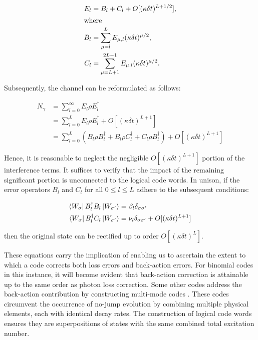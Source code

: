 \documentclass[11pt]{article}
\newcommand\0{\mathbf{0}}
\newcommand\<{\langle}
\renewcommand\>{\rangle}
\begin{document}
\begin{align*}
E_l &= B_l + C_l + O[(\kappa \delta t)^{L + 1/2}],	\\
\intertext{where}
B_l &= \sum_{\mu = l }^L E_{\mu, l}(\kappa \delta t)^{\mu / 2}, \\
C_l &= \sum_{\mu = L+1 }^{2L - 1} E_{\mu, l}(\kappa \delta t)^{\mu / 2}.
\end{align*}

Subsequently, the channel can be reformulated as follows:

\begin{align*}
N_\gamma &= \sum_{l=0}^\infty E_l \rho E_l^\dag\\
&= \sum_{l=0}^L E_l \rho E_l^\dag + O[(\kappa \delta t)^{L + 1}] \\
&= \sum_{l=0}^L(B_l \rho B_l^\dag + B_l \rho C_l^\dag + C_l \rho B_l^\dag) + O[(\kappa \delta t)^{L + 1}]
\end{align*}

Hence, it is reasonable to neglect the negligible $O[(\kappa \delta t)^{L + 1}]$ portion of the interference terms. It suffices to verify that the impact of the remaining significant portion is unconnected to the logical code words. In unison, if the error operators $B_l$ and $C_l$ for all $0 \leq l \leq L$ adhere to the subsequent conditions:

\begin{align}
\label{eq:aqec}
\begin{split}
\bra{W_\sigma} B_l^\dag B_l \ket{W_{\sigma'}} &= \beta_l \delta_{\sigma \sigma'} \\
\bra{W_\sigma} B_l^\dag C_l \ket{W_{ \sigma'}} &= \nu_l \delta_{\sigma \sigma'}	+ O[(\kappa \delta t)^{L + 1}]
\end{split}
\end{align}

then the original state can be rectified up to order $O[(\kappa \delta t)^L]$.

These equations carry the implication of enabling us to ascertain the extent to which a code corrects both loss errors and back-action errors. For binomial codes in this instance, it will become evident that back-action correction is attainable up to the same order as photon loss correction. Some other codes address the back-action contribution by constructing multi-mode codes \cite{chuang1997bosonic}. These codes circumvent the occurrence of no-jump evolution by combining multiple physical elements, each with identical decay rates. The construction of logical code words ensures they are superpositions of states with the same combined total excitation number.
\end{document}
